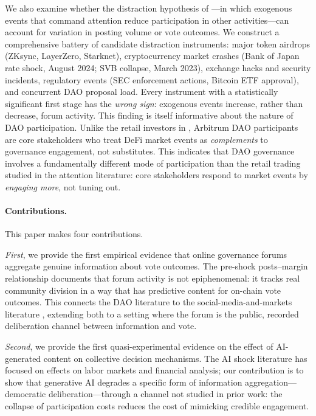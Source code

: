\documentclass[12pt]{article}
\begin{document}
We also examine whether the distraction hypothesis of \citet{hirshleifer2009}---in
which exogenous events that command attention reduce participation in other
activities---can account for variation in posting volume or vote outcomes. We
construct a comprehensive battery of candidate distraction instruments: major token
airdrops (ZKsync, LayerZero, Starknet), cryptocurrency market crashes (Bank of Japan
rate shock, August 2024; SVB collapse, March 2023), exchange hacks and security
incidents, regulatory events (SEC enforcement actions, Bitcoin ETF approval), and
concurrent DAO proposal load. Every instrument with a statistically significant
first stage has the \emph{wrong sign}: exogenous events increase, rather than
decrease, forum activity. This finding is itself informative about the nature of DAO
participation. Unlike the retail investors in \citet{hirshleifer2009}, Arbitrum DAO
participants are core stakeholders who treat DeFi market events as
\emph{complements} to governance engagement, not substitutes. This indicates that DAO governance involves a fundamentally different
mode of participation than the retail trading studied in the attention literature:
core stakeholders respond to market events by \emph{engaging more}, not tuning out.

\paragraph{Contributions.} This paper makes four contributions.

\emph{First}, we provide the first empirical evidence that online governance forums
aggregate genuine information about vote outcomes. The pre-shock posts--margin
relationship documents that forum activity is not epiphenomenal: it tracks real
community division in a way that has predictive content for on-chain vote outcomes.
This connects the DAO literature \citep{yermack2017, kiayias2022, barbereau2023}
to the social-media-and-markets literature \citep{antweiler2004, chen2014, cookson2020},
extending both to a setting where the forum is the public, recorded deliberation
channel between information and vote.

\emph{Second}, we provide the first quasi-experimental evidence on the effect of
AI-generated content on collective decision mechanisms. The AI shock literature
\citep{lopezlira2023, cao2023, brynjolfsson2023} has focused on effects on labor
markets and financial analysis; our contribution is to show that generative AI
degrades a specific form of information aggregation---democratic deliberation---through
a channel not studied in prior work: the collapse of participation costs reduces the cost of mimicking credible engagement.
\end{document}
